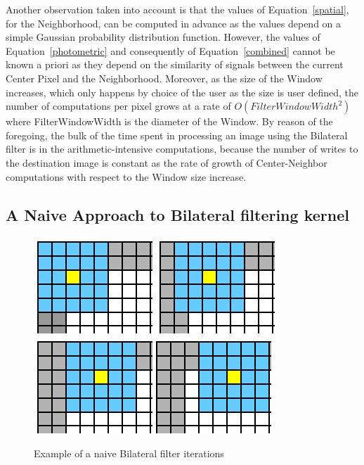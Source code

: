 \documentclass{IEEEtran}
\begin{document}
Another observation taken into account is that the values of Equation~\ref{spatial}, for the Neighborhood, can be computed in advance as the values depend on a simple Gaussian probability distribution function. However, the values of Equation~\ref{photometric} and consequently of Equation~\ref{combined} cannot be known a priori as they depend on the similarity of signals between the current Center Pixel and the Neighborhood. Moreover, as the size of the Window increases, which only happens by choice of the user as the size is user defined, the number of computations per pixel grows at a rate of $O(FilterWindowWidth^{2})$ where FilterWindowWidth is the diameter of the Window. By reason of the foregoing, the bulk of the time spent in processing an image using the Bilateral filter is in the arithmetic-intensive computations, because the number of writes to the destination image is constant as the rate of growth of Center-Neighbor computations with respect to the Window size increase.

\subsection{A Naive Approach to Bilateral filtering kernel}

\begin{figure}
\centering\includegraphics[scale=0.35]{images/the1}
\includegraphics[clip,scale=0.35]{images/the202}\includegraphics[scale=0.35]{images/the2}\includegraphics[scale=0.35]{images/the3}
\caption{Example of a naive Bilateral filter iterations}
\end{figure}
\end{document}

